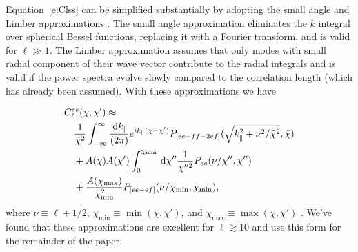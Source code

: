 \documentclass[twocolumn,prl,nofootinbib]{revtex4-1}
\newcommand{\ud}{\,\mathrm{d}}
\begin{document}
Equation~\ref{e:Clss} can be simplified substantially by adopting the small
angle and Limber approximations \citep{extened_limber}.  The small angle
approximation eliminates the $k$ integral over spherical Bessel functions, replacing it
with a Fourier transform, and is valid for $\ell \gg 1$. The Limber
approximation assumes that only modes with small radial component of their wave
vector contribute to the radial integrals and is valid if the power spectra
evolve slowly compared to the correlation length (which has already been
assumed). With these approximations we have

\begin{align}
    &C^{ss}_\ell(\chi, \chi') \approx
    \nonumber \\ & \quad
    \frac{1}{\bar\chi^2}
        \int_{-\infty}^\infty\frac{\ud k_\parallel}{(2 \pi)} 
        e^{i k_\parallel (\chi - \chi')}
        P_{[ee + ff - 2ef]}
        (\sqrt{k_\parallel^2 + \nu^2/\bar\chi^2}, \bar\chi)
    \nonumber \\ & \quad +
    A(\chi) A(\chi')
    \int_0^{\chi_{\rm min}}\ud\chi''
    \frac{1}{\chi^{\prime\prime 2}}
    P_{ee}(\nu/\chi'',\chi'')
    \nonumber \\ & \quad +
    \frac{A(\chi_{\max})}{\chi_{\min}^2}
    P_{[ee - ef]}(\nu/\chi_{\min}, \chi_{\min}),
\end{align}
where $\nu\equiv\ell + 1/2$, $\chi_{\min} \equiv \min(\chi, \chi')$,
and $\chi_{\max} \equiv \max(\chi,
\chi')$ .  We've found that these approximations are excellent for $\ell
\gtrsim 10$
and use this form for the remainder of the paper.
\end{document}
